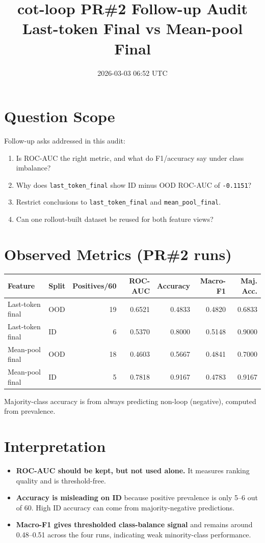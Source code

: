 \documentclass[11pt]{article}
\title{cot-loop PR\#2 Follow-up Audit \\ Last-token Final vs Mean-pool Final}
\author{}
\date{2026-03-03 06:52 UTC}
\begin{document}
\maketitle

\section*{Question Scope}
Follow-up asks addressed in this audit:
\begin{enumerate}
  \item Is ROC-AUC the right metric, and what do F1/accuracy say under class imbalance?
  \item Why does \texttt{last\_token\_final} show ID minus OOD ROC-AUC of \texttt{-0.1151}?
  \item Restrict conclusions to \texttt{last\_token\_final} and \texttt{mean\_pool\_final}.
  \item Can one rollout-built dataset be reused for both feature views?
\end{enumerate}

\section*{Observed Metrics (PR\#2 runs)}
\begin{center}
\begin{tabular}{@{}llrrrrr@{}}
\toprule
Feature & Split & Positives/60 & ROC-AUC & Accuracy & Macro-F1 & Maj. Acc. \\
\midrule
Last-token final & OOD & 19 & 0.6521 & 0.4833 & 0.4820 & 0.6833 \\
Last-token final & ID  & 6  & 0.5370 & 0.8000 & 0.5148 & 0.9000 \\
Mean-pool final  & OOD & 18 & 0.4603 & 0.5667 & 0.4841 & 0.7000 \\
Mean-pool final  & ID  & 5  & 0.7818 & 0.9167 & 0.4783 & 0.9167 \\
\bottomrule
\end{tabular}
\end{center}

\noindent
Majority-class accuracy is from always predicting non-loop (negative), computed from prevalence.

\section*{Interpretation}
\begin{itemize}
  \item \textbf{ROC-AUC should be kept, but not used alone.} It measures ranking quality and is threshold-free.
  \item \textbf{Accuracy is misleading on ID} because positive prevalence is only 5--6 out of 60. High ID accuracy can come from majority-negative predictions.
  \item \textbf{Macro-F1 gives thresholded class-balance signal} and remains around 0.48--0.51 across the four runs, indicating weak minority-class performance.
\end{itemize}
\end{document}
